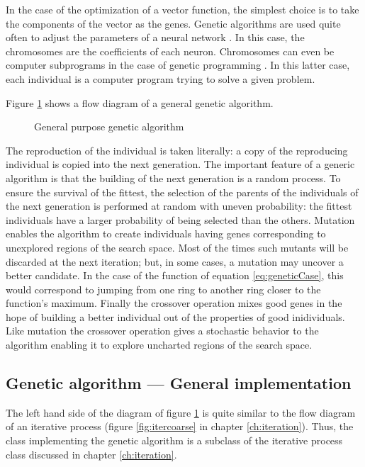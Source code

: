 \documentclass[twoside]{book}
\begin{document}
In the case of the optimization of a vector function, the simplest
choice is to take the components of the vector as the genes.
Genetic algorithms are used quite often to adjust the parameters
of a neural network \cite{BerLin}. In this case, the chromosomes
are the coefficients of each neuron. Chromosomes can even be
computer subprograms in the case of genetic programming
\cite{Koza}. In this latter case, each individual is a computer
program trying to solve a given problem.

Figure \ref{fig:geneticFlow} shows a flow diagram of a general
genetic algorithm.
\begin{figure}
\center{}
\caption{General purpose genetic algorithm}\label{fig:geneticFlow}
\end{figure}
The reproduction of the individual is taken literally: a copy of
the reproducing individual is copied into the next generation. The
important feature of a generic algorithm is that the building of
the next generation is a random process. To ensure the survival of
the fittest, the selection of the parents of the individuals of
the next generation is performed at random with uneven
probability: the fittest individuals have a larger probability of
being selected than the others. Mutation enables the algorithm to
create individuals having genes corresponding to unexplored
regions of the search space. Most of the times such mutants will
be discarded at the next iteration; but, in some cases, a mutation
may uncover a better candidate. In the case of the function of
equation \ref{eq:geneticCase}, this would correspond to jumping
from one ring to another ring closer to the function's maximum.
Finally the crossover operation mixes good genes in the hope of
building a better individual out of the properties of good
inidividuals. Like mutation the crossover operation gives a
stochastic behavior to the algorithm enabling it to explore
uncharted regions of the search space.


\subsection{Genetic algorithm --- General implementation}
\label{sec:gengenetic} The left hand side of the diagram of figure
\ref{fig:geneticFlow} is quite similar to the flow diagram of an
iterative process (\cf figure \ref{fig:itercoarse} in chapter
\ref{ch:iteration}). Thus, the class implementing the genetic
algorithm is a subclass of the iterative process class discussed
in chapter \ref{ch:iteration}.
\end{document}
